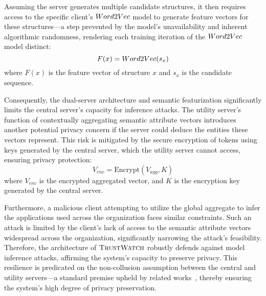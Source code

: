 Assuming the server generates multiple candidate structures, it then requires access to the specific client's \(Word2Vec\) model to generate feature vectors for these structures—a step prevented by the model's unavailability and inherent algorithmic randomness, rendering each training iteration of the \(Word2Vec\) model distinct:
\[ F(x) = Word2Vec(s_x) \]
where \(F(x)\) is the feature vector of structure \(x\) and \(s_x\) is the candidate sequence.

Consequently, the dual-server architecture and semantic featurization significantly limits the central server's capacity for inference attacks. The utility server's function of contextually aggregating semantic attribute vectors introduces another potential privacy concern if the server could deduce the entities these vectors represent. This risk is mitigated by the secure encryption of tokens using keys generated by the central server, which the utility server cannot access, ensuring privacy protection:
\[ V_{enc} = \text{Encrypt}(V_{agg}, K) \]
where \(V_{enc}\) is the encrypted aggregated vector, and \(K\) is the encryption key generated by the central server.

Furthermore, a malicious client attempting to utilize the global aggregate to infer the applications used across the organization faces similar constraints. Such an attack is limited by the client's lack of access to the semantic attribute vectors widespread across the organization, significantly narrowing the attack's feasibility. Therefore, the architecture of \(\relax{\textsc{TrustWatch}}\) robustly defends against model inference attacks, affirming the system's capacity to preserve privacy. This resilience is predicated on the non-collusion assumption between the central and utility servers—a standard premise upheld by related works~\cite{roy2020crypte,wu2022federated}, thereby ensuring the system's high degree of privacy preservation.